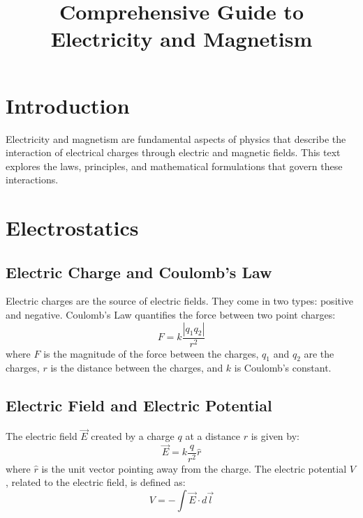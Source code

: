 \documentclass{article}
\title{Comprehensive Guide to Electricity and Magnetism}
\author{}
\date{}
\begin{document}
\maketitle

\section{Introduction}
Electricity and magnetism are fundamental aspects of physics that describe the interaction of electrical charges through electric and magnetic fields. This text explores the laws, principles, and mathematical formulations that govern these interactions.

\section{Electrostatics}
\subsection{Electric Charge and Coulomb's Law}
Electric charges are the source of electric fields. They come in two types: positive and negative. Coulomb's Law quantifies the force between two point charges:
\begin{equation}
    F = k \frac{|q_1 q_2|}{r^2}
\end{equation}
where \( F \) is the magnitude of the force between the charges, \( q_1 \) and \( q_2 \) are the charges, \( r \) is the distance between the charges, and \( k \) is Coulomb's constant.

\subsection{Electric Field and Electric Potential}
The electric field \( \vec{E} \) created by a charge \( q \) at a distance \( r \) is given by:
\begin{equation}
    \vec{E} = k \frac{q}{r^2} \hat{r}
\end{equation}
where \( \hat{r} \) is the unit vector pointing away from the charge. The electric potential \( V \), related to the electric field, is defined as:
\begin{equation}
    V = -\int \vec{E} \cdot d\vec{l}
\end{equation}
\end{document}
